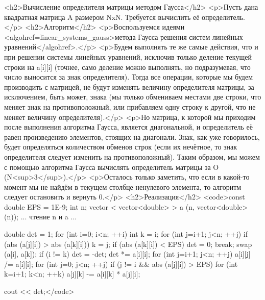 <h2>Вычисление определителя матрицы методом Гаусса</h2>
<p>Пусть дана квадратная матрица A размером NxN. Требуется вычислить её определитель.</p>
<h2>Алгоритм</h2>
<p>Воспользуемся идеями <algohref=linear_systems_gauss>метода Гаусса решения систем линейных уравнений</algohref>.</p>
<p>Будем выполнять те же самые действия, что и при решении системы линейных уравнений, исключив только деление текущей строки на a[i][i] (точнее, само деление можно выполнять, но подразумевая, что число выносится за знак определителя). Тогда все операции, которые мы будем производить с матрицей, не будут изменять величину определителя матрицы, за исключением, быть может, знака (мы только обмениваем местами две строки, что меняет знак на противоположный, или прибавляем одну строку к другой, что не меняет величину определителя).</p>
<p>Но матрица, к которой мы приходим после выполнения алгоритма Гаусса, является диагональной, и определитель её равен произведению элементов, стоящих на диагонали. Знак, как уже говорилось, будет определяться количеством обменов строк (если их нечётное, то знак определителя следует изменить на противоположный). Таким образом, мы можем с помощью алгоритма Гаусса вычислять определитель матрицы за O (N<sup>3</sup>).</p>
<p>Осталось только заметить, что если в какой-то момент мы не найдём в текущем столбце ненулевого элемента, то алгоритм следует остановить и вернуть 0.</p>
<h2>Реализация</h2>
<code>const double EPS = 1E-9;
int n;
vector < vector<double> > a (n, vector<double> (n));
... чтение n и a ...

double det = 1;
for (int i=0; i<n; ++i) {
	int k = i;
	for (int j=i+1; j<n; ++j)
		if (abs (a[j][i]) > abs (a[k][i]))
			k = j;
	if (abs (a[k][i]) < EPS) {
		det = 0;
		break;
	}
	swap (a[i], a[k]);
	if (i != k)
		det = -det;
	det *= a[i][i];
	for (int j=i+1; j<n; ++j)
		a[i][j] /= a[i][i];
	for (int j=0; j<n; ++j)
		if (j != i && abs (a[j][i]) > EPS)
			for (int k=i+1; k<n; ++k)
				a[j][k] -= a[i][k] * a[j][i];
}

cout << det;</code>